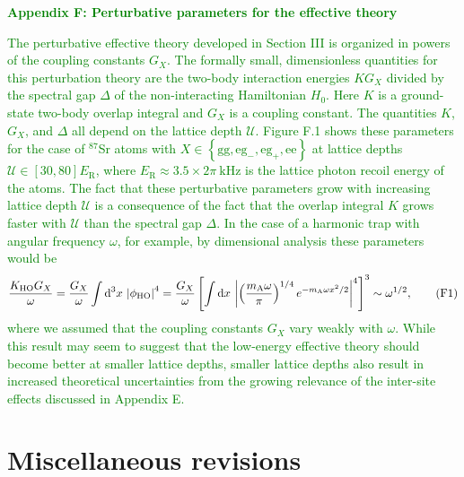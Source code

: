 \documentclass[preprint,showkeys,nofootinbib]{revtex4-1}
\renewcommand{\t}{\text} %
\newcommand{\f}{\dfrac} %
\newcommand{\p}[1]{\left(#1\right)} %
\renewcommand{\sp}[1]{\left[#1\right]} %
\renewcommand{\set}[1]{\left\{#1\right\}} %
\renewcommand{\d}{\text{d}}
\newcommand{\g}{\text{g}}
\newcommand{\e}{\text{e}}
\newcommand{\U}{\mathcal{U}}
\newcommand{\1}{\mathds{1}}
\newcommand{\mA}{m_{\text{A}}} %
\newcommand{\green}[1]{\textcolor{green}{#1}}
\newcounter{point}
\begin{document}
\begin{enumerate}[label=(R2.\arabic{point}.\arabic*)]
  \green{{\bf Appendix F: Perturbative parameters for the effective
      theory}}

  \green{The perturbative effective theory developed in Section III is
    organized in powers of the coupling constants $G_X$.  The formally
    small, dimensionless quantities for this perturbation theory are
    the two-body interaction energies $K G_X$ divided by the spectral
    gap $\Delta$ of the non-interacting Hamiltonian $H_0$.  Here $K$
    is a ground-state two-body overlap integral and $G_X$ is a
    coupling constant.  The quantities $K$, $G_X$, and $\Delta$ all
    depend on the lattice depth $\U$.  Figure F.1 shows these
    parameters for the case of ${}^{87}$Sr atoms with
    $X\in\set{\g\g, \e\g_-, \e\g_+, \e\e}$ at lattice depths
    $\U\in\sp{30,80}E_{\t{R}}$, where
    $E_{\t{R}}\approx3.5\times2\pi~\t{kHz}$ is the lattice photon
    recoil energy of the atoms.  The fact that these perturbative
    parameters grow with increasing lattice depth $\U$ is a
    consequence of the fact that the overlap integral $K$ grows faster
    with $\U$ than the spectral gap $\Delta$.  In the case of a
    harmonic trap with angular frequency $\omega$, for example, by
    dimensional analysis these parameters would be
    \begin{align*}
      \f{K_{\t{HO}} G_X}{\omega}
      = \f{G_X}{\omega} \int \d^3 x~\abs{\phi_{\t{HO}}}^4
      = \f{G_X}{\omega} \sp{\int \d x~
        \abs{\p{\f{\mA\omega}{\pi}}^{1/4} e^{-\mA\omega x^2/2}}^4}^3
      \sim \omega^{1/2},
      \tag{F1}
    \end{align*}
    where we assumed that the coupling constants $G_X$ vary weakly
    with $\omega$.  While this result may seem to suggest that the
    low-energy effective theory should become better at smaller
    lattice depths, smaller lattice depths also result in increased
    theoretical uncertainties from the growing relevance of the
    inter-site effects discussed in Appendix E.}



\end{enumerate}


\section*{Miscellaneous revisions}
\end{document}
